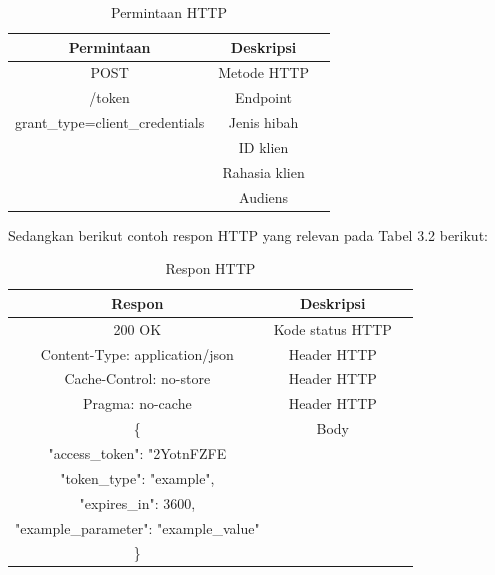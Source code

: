 \begin{table}[h]
    \caption{Permintaan HTTP}
    \vspace{0.5em}
    \centering
    \begin{tabular}{|c|c|c|}
        \hline
        Permintaan & Deskripsi \\
        \hline \hline
        POST & Metode HTTP \\
        \hline
        /token & Endpoint \\
        \hline
        grant\_type=client\_credentials & Jenis hibah \\
        \hline
        & ID klien \\
        \hline
        & Rahasia klien \\
        \hline
        & Audiens \\
        \hline
    \end{tabular}
    \label{Tab: Tabel Tinggi Berat}
\end{table}

Sedangkan berikut contoh respon HTTP yang relevan pada Tabel 3.2 berikut:

\begin{table}[h]
    \caption{Respon HTTP}
    \vspace{0.5em}
    \centering
    \begin{tabular}{|c|c|c|}
        \hline
        Respon & Deskripsi \\
        \hline \hline
        200 OK & Kode status HTTP \\
        \hline
        Content-Type: application/json & Header HTTP \\
        \hline
        Cache-Control: no-store & Header HTTP \\
        \hline
        Pragma: no-cache & Header HTTP \\
        \hline
        \{ & Body \\
        \hline
        "access\_token": "2YotnFZFE & \\
        \hline
        "token\_type": "example", & \\
        \hline
        "expires\_in": 3600, & \\
        \hline
        "example\_parameter": "example\_value" & \\
        \hline
        \} & \\
        \hline
    \end{tabular}
    \label{Tab: Tabel Tinggi Berat}
\end{table}

